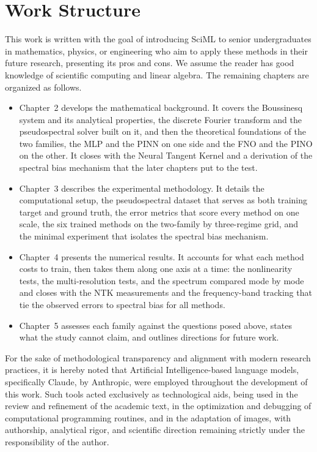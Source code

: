 \section{Work Structure}

This work is written with the goal of introducing SciML to senior undergraduates in mathematics, physics, or engineering who aim to apply these methods in their future research, presenting its pros and cons. We assume the reader has good knowledge of scientific computing and linear algebra.
The remaining chapters are organized as follows.

\begin{itemize}
    \item Chapter~2 develops the mathematical background. It covers the
          Boussinesq system and its analytical properties, the discrete Fourier transform and the pseudospectral solver built on it, and then the theoretical foundations of the two families, the MLP and the PINN on one side and the FNO and the PINO on the other. It closes with the Neural Tangent Kernel and a derivation of the spectral bias mechanism that the later chapters put to the test.

    \item Chapter~3 describes the experimental methodology. It details the computational setup, the pseudospectral dataset that serves as both training target and ground truth, the error metrics that score every method on one scale, the six trained methods on the two-family by three-regime grid, and the minimal experiment that isolates the spectral bias mechanism.

    \item Chapter~4 presents the numerical results. It accounts for what each method costs to train, then takes them along one axis at a time: the nonlinearity tests, the multi-resolution tests, and the spectrum compared mode by mode and closes with the NTK measurements and the frequency-band tracking that tie the observed errors to spectral bias for all methods.

    \item Chapter~5 assesses each family against the questions posed above, states what the study cannot claim, and outlines directions for future work.
\end{itemize}

For the sake of methodological transparency and alignment with modern research practices, it is hereby noted that Artificial Intelligence-based language models, specifically Claude, by Anthropic, were employed throughout the development of this work. Such tools acted exclusively as technological aids, being used in the review and refinement of the academic text, in the optimization and debugging of computational programming routines, and in the adaptation of images, with authorship, analytical rigor, and scientific direction remaining strictly under the responsibility of the author.